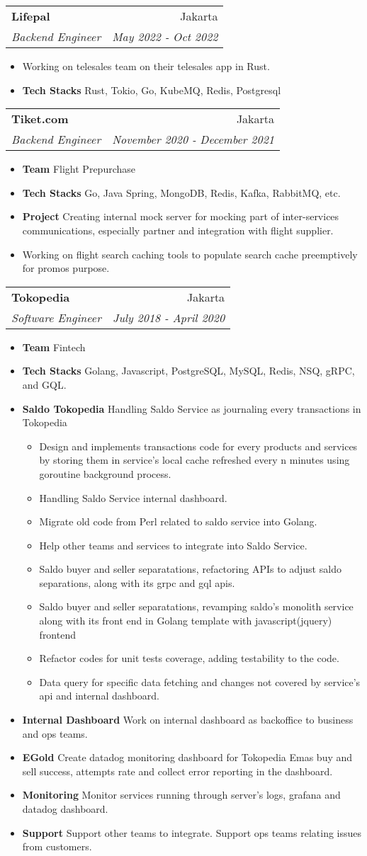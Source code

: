 \documentclass[letterpaper,11pt]{article}
\makeatletter
\newcommand{\resumeItem}[2]{
  \item\small{
    \textbf{#1}{ #2 \vspace{-2pt}}
  }
}
\newcommand{\resumeText}[1]{
  \item\small{
    \textrm{#1}
  }
}
\newcommand{\resumeSubheading}[4]{
  \vspace{-1pt}\item
    \begin{tabular*}{0.97\textwidth}[t]{l@{\extracolsep{\fill}}r}
      \textbf{#1} & #2 \\
      \textit{\small#3} & \textit{\small #4} \\
    \end{tabular*}\vspace{-5pt}
}
\newcommand{\resumeItemListStart}{\begin{itemize}}
\newcommand{\resumeItemListEnd}{\end{itemize}\vspace{-5pt}}
\makeatother
\begin{document}
    \resumeSubheading
    {Lifepal}{Jakarta}
    {Backend Engineer}{May 2022 - Oct 2022}
    \resumeItemListStart
      \resumeText
        {Working on telesales team on their telesales app in Rust.}
      \resumeItem{Tech Stacks}
        {Rust, Tokio, Go, KubeMQ, Redis, Postgresql}
    \resumeItemListEnd

    \resumeSubheading
      {Tiket.com}{Jakarta}
      {Backend Engineer}{November 2020 - December 2021}
      \resumeItemListStart
        \resumeItem{Team}
          {Flight Prepurchase}
        \resumeItem{Tech Stacks}
          {Go, Java Spring, MongoDB, Redis, Kafka, RabbitMQ, etc.}
        \resumeItem{Project}
          {Creating internal mock server for mocking part of inter-services communications, especially partner and integration with flight supplier.}
        \resumeText
          {Working on flight search caching tools to populate search cache preemptively for promos purpose.}
      \resumeItemListEnd

    \resumeSubheading
      {Tokopedia}{Jakarta}
      {Software Engineer}{July 2018 - April 2020}
      \resumeItemListStart
        \resumeItem{Team}{Fintech}
        \resumeItem{Tech Stacks}
          {Golang, Javascript, PostgreSQL, MySQL, Redis, NSQ, gRPC, and GQL.}
        \resumeItem{Saldo Tokopedia}
          {Handling Saldo Service as journaling every transactions in Tokopedia}
          \resumeItemListStart
            \resumeText{Design and implements transactions code for every products and services by storing them in service's local cache refreshed every n minutes using goroutine background process.}
            \resumeText{Handling Saldo Service internal dashboard.}
            \resumeText{Migrate old code from Perl related to saldo service into Golang.}
            \resumeText{Help other teams and services to integrate into Saldo Service.}
            \resumeText{Saldo buyer and seller separatations, refactoring APIs to adjust saldo separations, along with its grpc and gql apis.}
            \resumeText{Saldo buyer and seller separatations, revamping saldo's monolith service along with its front end in Golang template with javascript(jquery) frontend}
            \resumeText{Refactor codes for unit tests coverage, adding testability to the code.}
            \resumeText{Data query for specific data fetching and changes not covered by service's api and internal dashboard.}
          \resumeItemListEnd
        \resumeItem{Internal Dashboard}
          {Work on internal dashboard as backoffice to business and ops teams.}
        \resumeItem{EGold}
          {Create  datadog monitoring dashboard for Tokopedia Emas buy and sell success, attempts rate and collect error reporting in the dashboard.}
        \resumeItem{Monitoring}
          {Monitor services running through server's logs, grafana and datadog dashboard.}
        \resumeItem{Support}
          {Support other teams to integrate. Support ops teams relating issues from customers.}
      \resumeItemListEnd
\end{document}
